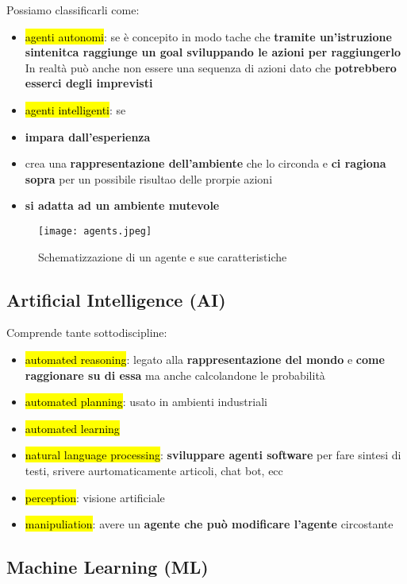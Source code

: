 Possiamo classificarli come:
\begin{itemize}
	\item \hl{agenti autonomi}: se è concepito in modo tache che \textbf{tramite un'istruzione sintenitca raggiunge un goal sviluppando le azioni per raggiungerlo}  In realtà può anche non essere una sequenza di azioni dato che \textbf{potrebbero esserci degli imprevisti}
	\item \hl{agenti intelligenti}: se
	\item \textbf{impara dall'esperienza}
	\item crea una \textbf{rappresentazione dell'ambiente} che lo circonda e \textbf{ci ragiona sopra} per un possibile risultao delle prorpie azioni
	\item \textbf{si adatta ad un ambiente mutevole}
\end{itemize}

\begin{figure}[H]
\centering
\texttt{[image: agents.jpeg]}
\caption{Schematizzazione di un agente e sue caratteristiche} 
\label{agente}
\end{figure}


\subsection{Artificial Intelligence (AI)}

Comprende tante sottodiscipline:
\begin{itemize}
	\item \hl{automated reasoning}: legato alla \textbf{rappresentazione del mondo} e \textbf{come raggionare su di essa} ma anche calcolandone le probabilità
	\item \hl{automated planning}: usato in ambienti industriali
	\item \hl{automated learning}
	\item \hl{natural language processing}: \textbf{sviluppare agenti software} per fare sintesi di testi, srivere aurtomaticamente articoli, chat bot, ecc 
	\item \hl{perception}: visione artificiale
	\item \hl{manipuliation}: avere un \textbf{agente che può modificare l'agente} circostante
\end{itemize}


\subsection{Machine Learning (ML)}

